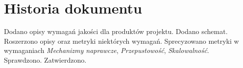 \documentclass[10pt]{dokument-ppi}
\begin{document}
\newpage
\section*{Historia dokumentu}
\begin{versions}
        Dodano opisy wymagań jakości dla produktów projektu.
        Dodano schemat.
        Roszerzono opisy oraz metryki niektórych wymagań.
        Sprecyzowano metryki w wymaganiach \emph{Mechanizmy naprawcze},
        \emph{Przepustowość}, \emph{Skalowalność}.\\
        Sprawdzono. Zatwierdzono.
\end{versions}
\end{document}
